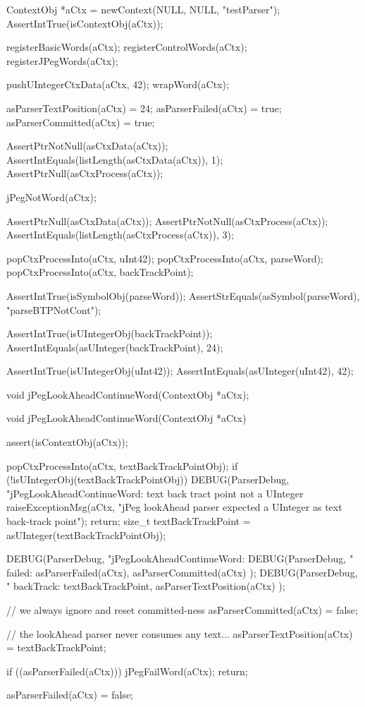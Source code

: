 \startCTest
  ContextObj *aCtx = newContext(NULL, NULL, "testParser");
  AssertIntTrue(isContextObj(aCtx));
  
  registerBasicWords(aCtx);
  registerControlWords(aCtx);
  registerJPegWords(aCtx);
  
  pushUIntegerCtxData(aCtx, 42);
  wrapWord(aCtx);
  
  asParserTextPosition(aCtx) = 24;
  asParserFailed(aCtx)       = true;
  asParserCommitted(aCtx)    = true;
  
  AssertPtrNotNull(asCtxData(aCtx));
  AssertIntEquals(listLength(asCtxData(aCtx)), 1);
  AssertPtrNull(asCtxProcess(aCtx));
  
  jPegNotWord(aCtx);
  
  AssertPtrNull(asCtxData(aCtx));
  AssertPtrNotNull(asCtxProcess(aCtx));
  AssertIntEquals(listLength(asCtxProcess(aCtx)), 3);
  
  popCtxProcessInto(aCtx, uInt42);
  popCtxProcessInto(aCtx, parseWord);
  popCtxProcessInto(aCtx, backTrackPoint);
  
  AssertIntTrue(isSymbolObj(parseWord));
  AssertStrEquals(asSymbol(parseWord), "parseBTPNotCont");
  
  AssertIntTrue(isUIntegerObj(backTrackPoint));
  AssertIntEquals(asUInteger(backTrackPoint), 24);
  
  AssertIntTrue(isUIntegerObj(uInt42));
  AssertIntEquals(asUInteger(uInt42), 42);
\stopCTest
\stopTestCase
\stopTestSuite

\startTestSuite[jPegLookAheadContinueWord]

\startCHeader
void jPegLookAheadContinueWord(ContextObj *aCtx);
\stopCHeader

\startCCode
void jPegLookAheadContinueWord(ContextObj *aCtx) {
  assert(isContextObj(aCtx));

  popCtxProcessInto(aCtx, textBackTrackPointObj);
  if (!isUIntegerObj(textBackTrackPointObj)) {
    DEBUG(ParserDebug,
      "jPegLookAheadContinueWord: text back tract point not a UInteger%
    raiseExceptionMsg(aCtx,
      "jPeg lookAhead parser expected a UInteger as text back-track point");
    return;
  }
  size_t textBackTrackPoint = asUInteger(textBackTrackPointObj);
  
  DEBUG(ParserDebug, "jPegLookAheadContinueWord:%
  DEBUG(ParserDebug,
    "  failed: %
    asParserFailed(aCtx), asParserCommitted(aCtx)
  );
  DEBUG(ParserDebug,
    "  backTrack: %
    textBackTrackPoint, asParserTextPosition(aCtx)
  );

  // we always ignore and reset committed-ness
  asParserCommitted(aCtx) = false;
  
  // the lookAhead parser never consumes any text...
  asParserTextPosition(aCtx) = textBackTrackPoint;
  
  if ((asParserFailed(aCtx))) {
    jPegFailWord(aCtx);
    return;
  }

  asParserFailed(aCtx) = false;
}
\stopCCode

